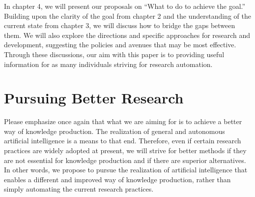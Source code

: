 In chapter 4, we will present our proposals on ``What to do to achieve the goal.'' Building upon the clarity of the goal from chapter 2 and the understanding of the current state from chapter 3, we will discuss how to bridge the gaps between them. We will also explore the directions and specific approaches for research and development, suggesting the policies and avenues that may be most effective. Through these discussions, our aim with this paper is to providing useful information for as many individuals striving for research automation.


\section{Pursuing Better Research}
Please emphasize once again that what we are aiming for is to achieve a better way of knowledge production. The realization of general and autonomous artificial intelligence is a means to that end. Therefore, even if certain research practices are widely adopted at present, we will strive for better methods if they are not essential for knowledge production and if there are superior alternatives. In other words, we propose to pursue the realization of artificial intelligence that enables a different and improved way of knowledge production, rather than simply automating the current research practices.

